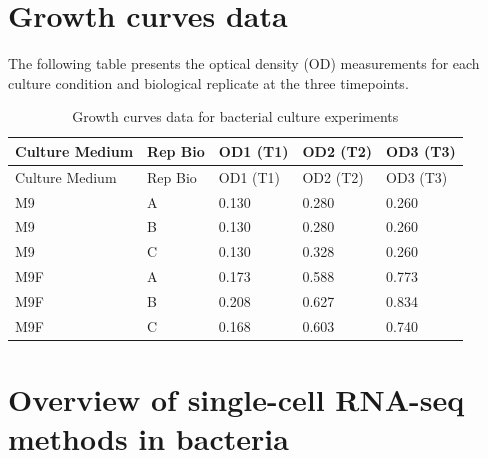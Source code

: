 \documentclass[
  11pt,
  a4paper,
]{report}
\begin{document}
\section{Growth curves data}\label{sec-appendix-growth}

The following table presents the optical density (OD) measurements for
each culture condition and biological replicate at the three timepoints.

\begin{longtable}[]{@{}lllll@{}}
\caption{Growth curves data for bacterial culture
experiments}\label{tbl-growth-curves}\tabularnewline
\toprule\noalign{}
Culture Medium & Rep Bio & OD1 (T1) & OD2 (T2) & OD3 (T3) \\
\midrule\noalign{}
\endfirsthead
\toprule\noalign{}
Culture Medium & Rep Bio & OD1 (T1) & OD2 (T2) & OD3 (T3) \\
\midrule\noalign{}
\endhead
\bottomrule\noalign{}
\endlastfoot
M9 & A & 0.130 & 0.280 & 0.260 \\
M9 & B & 0.130 & 0.280 & 0.260 \\
M9 & C & 0.130 & 0.328 & 0.260 \\
M9F & A & 0.173 & 0.588 & 0.773 \\
M9F & B & 0.208 & 0.627 & 0.834 \\
M9F & C & 0.168 & 0.603 & 0.740 \\
\end{longtable}

\section{Overview of single-cell RNA-seq methods in
bacteria}\label{sec-appendix-nishimura}
\end{document}
